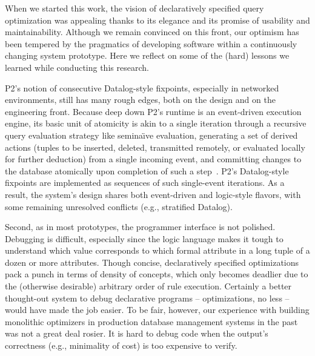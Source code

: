 When we started this work, the vision of declaratively specified query
optimization was appealing thanks to its elegance and its promise of usability
and maintainability.  Although we remain convinced on this front, our optimism
has been tempered by the pragmatics of developing software within a
continuously changing system prototype.  Here we reflect on some of the (hard)
lessons we learned while conducting this research.

P2's notion of consecutive Datalog-style fixpoints, especially in networked
environments, still has many rough edges, both on the design and on the
engineering front.  Because deep down P2's runtime is an event-driven execution
engine, its basic unit of atomicity is akin to a single iteration through a
recursive query evaluation strategy like semina\"{\i}ve evaluation, generating a
set of derived actions (tuples to be inserted, deleted, transmitted remotely,
or evaluated locally for further deduction) from a single incoming event, and
committing changes to the database atomically upon completion of such a
step~\cite{LuThesis}.  P2's Datalog-style fixpoints are implemented as
sequences of such single-event iterations.  As a result, the system's design
shares both event-driven and logic-style flavors, with some remaining
unresolved conflicts (e.g., stratified Datalog).


Second, as in most prototypes, the programmer interface is not polished.
Debugging is difficult, especially since the logic language makes it tough to
understand which value corresponds to which formal attribute in a long tuple of
a dozen or more attributes.  Though concise, declaratively specified
optimizations pack a punch in terms of density of concepts, which only becomes
deadlier due to the (otherwise desirable) arbitrary order of rule execution.
Certainly a better thought-out system to debug declarative programs --
optimizations, no less -- would have made the job easier.  To be fair, however,
our experience with building monolithic optimizers in production database
management systems in the past was not a great deal rosier.  It is hard to
debug code when the output's correctness (e.g., minimality of cost) is too
expensive to verify.


